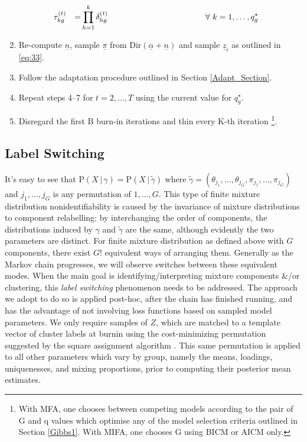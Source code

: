 \documentclass[a4paper,12pt,fleqn]{article}
\numberwithin{equation}{section}
\def\given{\,|\,}
\begin{document}
\begin{enumerate}[label*=\arabic*.]
\begin{alignat*}{4}
		&\tau_{kg}^{\left(t\right)} &=& \prod_{h=1}^{k}\delta_{hg}^{\left(t\right)}\quad\hspace{38mm}\forall~k=1,\ldots,q_g^\star\nonumber
		\end{alignat*}
	\item Re-compute $\underline{n}$, sample $\underline{\pi}$ from $\textrm{Dir}\left(\underline{\alpha} + \underline{n}\right)$ and sample $\underline{z}_i$ as outlined in \eqref{eq:33}.
	\item Follow the adaptation procedure outlined in Section \ref{Adapt_Section}.
	\item Repeat steps 4--7 for $t=2,\ldots,T$ using the current value for $q_g^\star$.
	\item Disregard the first $\textrm{B}$ burn-in iterations and thin every $\textrm{K}$-th iteration \footnote{With MFA, one chooses between competing models according to the pair of G and q values which optimise any of the model selection criteria outlined in Section \ref{Gibbs1}. With MIFA, one chooses G using BICM or AICM only.}.
\end{enumerate}
\subsection[Label Switching]{Label Switching}
It's easy to see that $\mathrm{P}\left(X\given\gamma\right) = \mathrm{P}\left(X\given\tilde\gamma\right)$ where $\tilde\gamma = \left(\theta_{j_1},\ldots,\theta_{j_G},\pi_{j_1},\ldots,\pi_{j_G}\right)$ and $j_1,\ldots,j_G$ is any permutation of $1,\ldots,G$. This type of finite mixture distribution nonidentifiability is caused by the invariance of mixture distributions to component relabelling: by interchanging the order of components, the distributions induced by $\gamma$ and $\tilde{\gamma}$ are the same, although evidently the two parameters are distinct. For finite mixture distribution as defined above with $G$ components, there exist $G!$ equivalent ways of arranging them. Generally as the Markov chain progresses, we will observe switches between these equivalent modes. When the main goal is identifying/interpreting mixture components \&/or clustering, this \textit{label switching} phenomenon needs to be addressed. The approach we adopt to do so is applied post-hoc, after the chain has finished running, and has the advantage of not involving loss functions based on sampled model parameters. We only require samples of $Z$, which are matched to a template vector of cluster labels at burnin using the cost-minimizing permutation suggested by the square assignment algorithm \citep{CarpToth1980}. This same permutation is applied to all other parameters which vary by group, namely the means, loadings, uniquenesses, and mixing proportions, prior to computing their posterior mean estimates.
\end{document}
